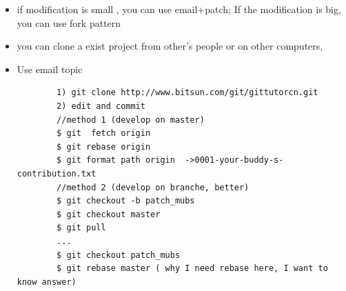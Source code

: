 \documentclass[a4paper,12pt,twoside]{book}
\begin{document}
\begin{itemize}
\begin{itemize}

%
%
%
%
	\begin{itemize}
	\item if modification is small , you can use email+patch; If the modification is big, you can use fork pattern

    \item you can clone a exist project from other's people or on other computers,
	\item Use email topic
		\begin{verbatim}
		1) git clone http://www.bitsun.com/git/gittutorcn.git
		2) edit and commit
		//method 1 (develop on master)
		$ git  fetch origin
		$ git rebase origin
		$ git format path origin  ->0001-your-buddy-s-contribution.txt
		//method 2 (develop on branche, better)
		$ git checkout -b patch_mubs
		$ git checkout master
		$ git pull
		...
		$ git checkout patch_mubs
		$ git rebase master ( why I need rebase here, I want to know answer)
		

\end{verbatim}
\end{itemize}
\end{itemize}
\end{itemize}
\end{document}
